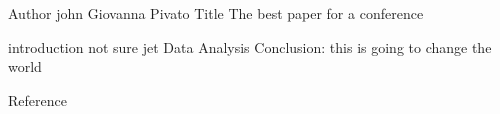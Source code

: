 Author john Giovanna Pivato
Title The best paper for a conference

introduction not sure jet
Data
Analysis
Conclusion: this is going to change the world

Reference
